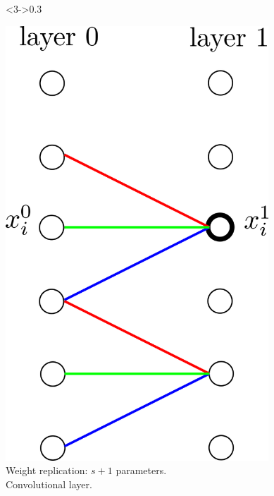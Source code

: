 \documentclass[xcolor=pdftex,dvipsnames,table,mathserif]{beamer}
\begin{document}
{\begin{columns}
    \begin{column}<3->{0.3\textwidth}
      \begin{center}
        \includegraphics[width=0.74\textwidth]{convolutional_layer.png}
        \\ \scriptsize{Weight replication: $s+1$ parameters.\\
          \alert{Convolutional layer.}}
      \end{center}
    \end{column}

  \end{columns}



}
\end{document}
